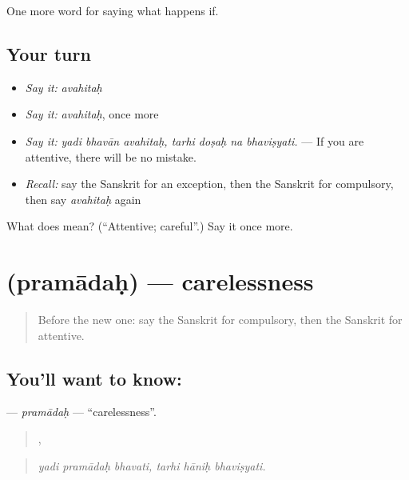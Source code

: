 \begin{grammarlens}[title={What you've built}]
One more word for saying what happens if.
\end{grammarlens}

\subsection*{Your turn}
\begin{itemize}
\raggedright
  \item \emph{Say it:} \emph{avahitaḥ}
  \item \emph{Say it:} \emph{avahitaḥ}, once more
  \item \emph{Say it:} \emph{yadi bhavān avahitaḥ, tarhi doṣaḥ na bhaviṣyati.} — If you are attentive, there will be no mistake.
  \item \emph{Recall:} say the Sanskrit for an exception, then the Sanskrit for compulsory, then say \emph{avahitaḥ} again
\end{itemize}

\begin{tcolorbox}[breakable,colback=teal!4,colframe=teal!35!black,title={Before you move on}]
What does  mean? (\textquotedblleft{}Attentive; careful\textquotedblright{}.) Say it once more.
\end{tcolorbox}
\section[\texorpdfstring{\sk{प्रमादः} (pramādaḥ)}{प्रमादः (pramādaḥ)}]{ (pramādaḥ) — carelessness}

\label{lesson:SA-C374-pramadah}



\begin{quote}
Before the new one: say the Sanskrit for compulsory, then the Sanskrit for attentive.
\end{quote}

\subsection*{You'll want to know: }
\textbf{} — \emph{pramādaḥ} — \textquotedblleft{}carelessness\textquotedblright{}.

\begin{quote}
  ,   
\end{quote}

\begin{quote}
\emph{yadi pramādaḥ bhavati, tarhi hāniḥ bhaviṣyati.}
\end{quote}

